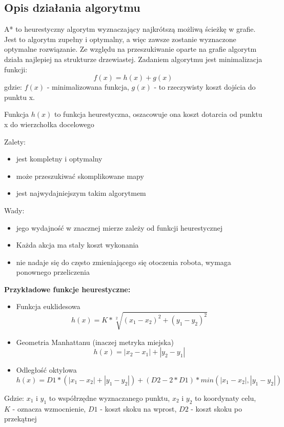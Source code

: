 \subsection{Opis działania algorytmu}

A* to heurestyczny algorytm wyznaczający najkrótszą możliwą ścieżkę w grafie. 
Jest to algorytm zupełny i optymalny, a więc zawsze zostanie wyznaczone optymalne 
rozwiązanie. Ze względu na przeszukiwanie oparte na grafie algorytm działa najlepiej na strukturze drzewiastej.
Zadaniem algorytmu jest minimalizacja funkcji:
\begin{equation}
	f(x)=h(x) + g(x)
	\label{Eq:funkcjaKosztuAStar}
\end{equation}
gdzie: $f(x)$ - minimalizowana funkcja, $g(x)$ - to rzeczywisty koszt dojścia do punktu x.

Funkcja $h(x)$ to funkcja heurestyczna, oszacowuje ona koszt dotarcia od punktu x do wierzchołka docelowego

Zalety:
\begin{itemize}
	\item jest kompletny i optymalny
	\item może przeszukiwać skomplikowane mapy
	\item jest najwydajniejszym takim algorytmem
\end{itemize}
Wady:
\begin{itemize}
	\item jego wydajność w znacznej mierze zależy od funkcji heurestycznej
	\item Każda akcja ma stały koszt wykonania
	\item nie nadaje się do często zmieniającego się otoczenia robota, wymaga ponownego przeliczenia
\end{itemize}


\textbf{Przykładowe funkcje heurestyczne:}
\begin{itemize}
	\item Funkcja euklidesowa
	      \begin{equation}
	      	h(x) = K * \sqrt[2]{(x_1 - x_2)^2 + (y_1 - y_2)^2}
	      	\label{Eq:heuresticEucalides}
	      \end{equation}
	\item Geometria Manhattanu (inaczej metryka miejska)
	      \begin{equation}
	      	h(x) = |x_2 - x_1| + |y_2 - y_1|
	      	\label{Eq:heuresticManhattanu}
	      \end{equation}
	\item Odległość oktylowa
		\begin{equation}
			h(x) = D1 * (|x_1 - x_2| + |y_1 - y_2|) + (D2 - 2*D1) * min(|x_1 - x_2|, |y_1 - y_2|)
			\label{Eq:heuresticOctileDistance}
		\end{equation}

\end{itemize}
Gdzie: $x_1$ i $y_1$ to współrzędne wyznaczanego punktu, $x_2$ i $y_2$ to koordynaty celu, $K$ - oznacza wzmocnienie, $D1$ - koszt skoku na wprost, $D2$ - koszt skoku po przekątnej

